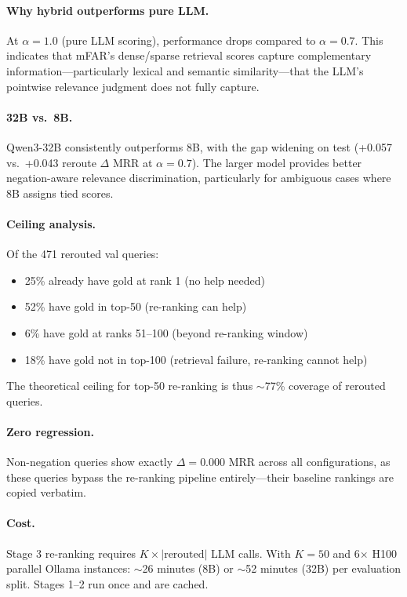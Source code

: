 \paragraph{Why hybrid outperforms pure LLM.} At $\alpha=1.0$ (pure LLM scoring), performance drops compared to $\alpha=0.7$. This indicates that mFAR's dense/sparse retrieval scores capture complementary information---particularly lexical and semantic similarity---that the LLM's pointwise relevance judgment does not fully capture.

\paragraph{32B vs.\ 8B.} Qwen3-32B consistently outperforms 8B, with the gap widening on test (+0.057 vs.\ +0.043 reroute $\Delta$ MRR at $\alpha=0.7$). The larger model provides better negation-aware relevance discrimination, particularly for ambiguous cases where 8B assigns tied scores.

\paragraph{Ceiling analysis.} Of the 471 rerouted val queries:
\begin{itemize}
    \item 25\% already have gold at rank 1 (no help needed)
    \item 52\% have gold in top-50 (re-ranking can help)
    \item 6\% have gold at ranks 51--100 (beyond re-ranking window)
    \item 18\% have gold not in top-100 (retrieval failure, re-ranking cannot help)
\end{itemize}
The theoretical ceiling for top-50 re-ranking is thus $\sim$77\% coverage of rerouted queries.

\paragraph{Zero regression.} Non-negation queries show exactly $\Delta=0.000$ MRR across all configurations, as these queries bypass the re-ranking pipeline entirely---their baseline rankings are copied verbatim.

\paragraph{Cost.} Stage 3 re-ranking requires $K \times |\text{rerouted}|$ LLM calls. With $K=50$ and 6$\times$ H100 parallel Ollama instances: $\sim$26 minutes (8B) or $\sim$52 minutes (32B) per evaluation split. Stages 1--2 run once and are cached.
